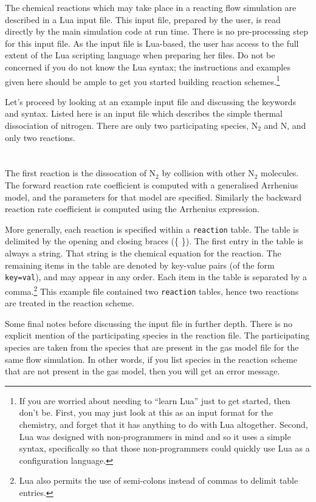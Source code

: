 The chemical reactions which may take place in a reacting flow
simulation are described in a Lua input file.
This input file, prepared by the user, is read directly by the
main simulation code at run time.
There is no pre-processing step for this input file.
As the input file is Lua-based, the user has access to the 
full extent of the Lua scripting language when
preparing her files.
Do not be concerned if you do not know the Lua syntax; the instructions
and examples given here should be ample to get you started building
reaction schemes.\footnote{If you are worried about needing to ``learn Lua'' just
to get started, then don't be.  First, you may just look at this as an input
format for the chemistry, and forget that it has anything to do with Lua altogether.
Second, Lua was designed with non-programmers in mind and so it uses a simple syntax, 
specifically so that those non-programmers could quickly use Lua
as a configuration language.}

Let's proceed by looking at an example input file and discussing
the keywords and syntax.
Listed here is an input file which describes the simple thermal
dissociation of nitrogen.
There are only two participating species, N$_2$ and N, and
only two reactions.\\
\topbar\\

\bottombar\\
The first reaction is the dissocation of N$_2$ by collision with other
N$_2$ molecules.
The forward reaction rate coefficient is computed with a generalised
Arrhenius model, and the parameters for that model are specified.
Similarly the backward reaction rate coefficient is computed using
the Arrhenius expression.

More generally, each reaction is specified within a \texttt{reaction} table.
The table is delimited by the opening and closing braces (\{ \}).
The first entry in the table is always a string.
That string is the chemical equation for the reaction.
The remaining items in the table are denoted by key-value pairs (of the form \texttt{key=val}),  and may appear
in any order.
Each item in the table is separated by a comma.\footnote{Lua also permits the use
of semi-colons instead of commas to delimit table entries.}
This example file contained two \texttt{reaction} tables, hence two reactions
are treated in the reaction scheme.

Some final notes before discussing the input file in further depth.
There is no explicit mention of the participating species in the reaction file.
The participating species are taken from the species that are present in
the gas model file for the same flow simulation.
In other words, if you list species in the reaction scheme that are not
present in the gas model, then you will get an error message.

